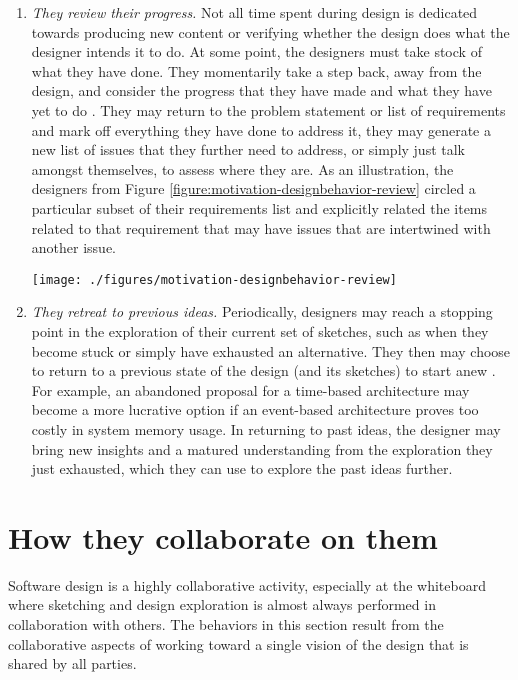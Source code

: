 \documentclass[12pt,fleqn]{ucithesis}
\begin{document}
\begin{enumerate}
 \item \emph{They review their progress.} Not all time spent during design is dedicated towards producing new content or verifying whether the design does what the designer intends it to do. At some point, the designers must take stock of what they have done. They momentarily take a step back, away from the design, and consider the progress that they have made and what they have yet to do \cite{mangano2012design}. They may return to the problem statement or list of requirements and mark off everything they have done to address it, they may generate a new list of issues that they further need to address, or simply just talk amongst themselves, to assess where they are. As an illustration, the designers from Figure \ref{figure:motivation-designbehavior-review} circled a particular subset of their requirements list and explicitly related the items related to that requirement that may have issues that are intertwined with another issue.

 \begin{figure*}[tbh]
  \centering
  \texttt{[image: ./figures/motivation-designbehavior-review]}
  \caption{While reviewing progress, designs may mark up their requirement lists.}
  \label{figure:motivation-designbehavior-review}
\end{figure*} 

 \item \emph{They retreat to previous ideas.} Periodically, designers may reach a stopping point in the exploration of their current set of sketches, such as when they become stuck or simply have exhausted an alternative. They then may choose to return to a previous state of the design (and its sketches) to start anew \cite{zannier2007model}. For example, an abandoned proposal for a time-based architecture may become a more lucrative option if an event-based architecture proves too costly in system memory usage. In returning to past ideas, the designer may bring new insights and a matured understanding from the exploration they just exhausted, which they can use to explore the past ideas further.
 \end{enumerate}

\section{How they collaborate on them}
\label{chapter:motivation:collaboration}

Software design is a highly collaborative activity, especially at the whiteboard where sketching and design exploration is almost always performed in collaboration with others. The behaviors in this section result from the collaborative aspects of working toward a single vision of the design that is shared by all parties.
\end{document}
